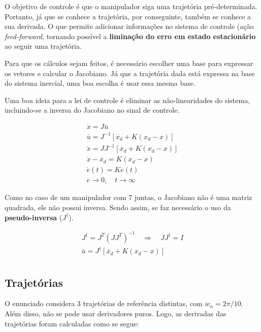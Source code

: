 \documentclass[a4paper,11pt]{article}
\theoremstyle{mytheor}
\begin{document}
O objetivo de controle é que o manipulador siga uma trajetória pré-determinada. Portanto, já que se conhece a trajetória, por conseguinte, também se conhece a sua derivada. O que permite adicionar informações no sistema de controle (ação \textit{feed-forward}, tornando possível a \textbf{liminação do erro em estado estacionário} ao seguir uma trajetória.

Para que os cálculos sejam feitos, é necessário escolher uma base para expressar os vetores e calcular o Jacobiano. Já que a trajetória dada está expressa na base do sistema inercial, uma boa escolha é usar essa mesma base.

Uma boa ideia para a lei de controle é eliminar as não-linearidades do sistema, incluindo-se a inversa do Jacobiano no sinal de controle.

\begin{gather*}
\dot{x} = J\bar{u} \\
\bar{u} = J^{-1} [ \dot{x_d} + K (x_d - x) ] \\
\dot{x} = JJ^{-1} [ \dot{x_d} + K (x_d - x) ] \\
\dot{x} - \dot{x_d} = K (x_d - x) \\
\dot{e}(t)= Ke(t)  \\
e \longrightarrow 0, \quad t \longrightarrow \infty
\end{gather*}

Como no caso de um manipulador com 7 juntas, o Jacobiano não é uma matriz quadrada, ele não possui inversa. Sendo assim, se faz necessário o uso da \textbf{pseudo-inversa} ($ J^\dagger $).


\begin{gather*}
J^\dagger = J^T(JJ^T)^{-1} \quad \Rightarrow \quad JJ^\dagger = I \\
\bar{u} = J^{\dagger} [ \dot{x_d} + K (x_d - x) ] \\
\end{gather*}


\subsection{Trajetórias}

O enunciado considera 3 trajetórias de referência distintas, com $w_n = 2\pi/10 $. Além disso, não se pode usar derivadores puros. Logo, as derivadas das trajetórias foram calculadas como se segue:
\end{document}
